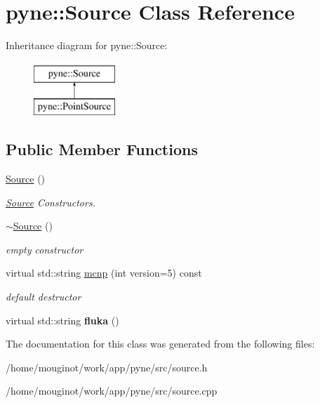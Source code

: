 \hypertarget{classpyne_1_1_source}{}\section{pyne\+:\+:Source Class Reference}
\label{classpyne_1_1_source}
Inheritance diagram for pyne\+:\+:Source\+:\begin{figure}[H]
\begin{center}
\leavevmode
\includegraphics[height=2.000000cm]{classpyne_1_1_source}
\end{center}
\end{figure}
\subsection*{Public Member Functions}
\begin{DoxyCompactItemize}
\item 
\mbox{\label{classpyne_1_1_source_aafbe7b388dcd2f67d4cb706843d8ff17}} 
\hyperlink{classpyne_1_1_source_aafbe7b388dcd2f67d4cb706843d8ff17}{Source} ()
\begin{DoxyCompactList}\small\item\em \hyperlink{classpyne_1_1_source}{Source} Constructors. \end{DoxyCompactList}\item 
\mbox{\label{classpyne_1_1_source_ad25e278cf6787a6153fad6bffca500e8}} 
\hyperlink{classpyne_1_1_source_ad25e278cf6787a6153fad6bffca500e8}{$\sim$\+Source} ()
\begin{DoxyCompactList}\small\item\em empty constructor \end{DoxyCompactList}\item 
\mbox{\label{classpyne_1_1_source_a2e85c806230c659c2c5681f8751ca8b9}} 
virtual std\+::string \hyperlink{classpyne_1_1_source_a2e85c806230c659c2c5681f8751ca8b9}{mcnp} (int version=5) const
\begin{DoxyCompactList}\small\item\em default destructor \end{DoxyCompactList}\item 
\mbox{\label{classpyne_1_1_source_a4c17f7fb967e3d5e080a02de57e9a17c}} 
virtual std\+::string {\bfseries fluka} ()
\end{DoxyCompactItemize}


The documentation for this class was generated from the following files\+:\begin{DoxyCompactItemize}
\item 
/home/mouginot/work/app/pyne/src/source.\+h\item 
/home/mouginot/work/app/pyne/src/source.\+cpp\end{DoxyCompactItemize}
